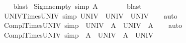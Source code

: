 \begin{isabellebody}
%
\isadelimproof
\ \ %
\endisadelimproof
%
\isatagproof
{}\isamarkupfalse%
\ blast%
\endisatagproof
{\isafoldproof}%
%
\isadelimproof
\isanewline
%
\endisadelimproof
\isanewline
{}\isamarkupfalse%
\ Sigma{\isacharunderscore}{\kern0pt}empty{}\ {\isacharbrackleft}{\kern0pt}simp{\isacharbrackright}{\kern0pt}{\isacharcolon}{\kern0pt}\ {\isachardoublequoteopen}A\ {\isasymtimes}\ {\isacharbraceleft}{\kern0pt}{\isacharbraceright}{\kern0pt}\ {\isacharequal}{\kern0pt}\ {\isacharbraceleft}{\kern0pt}{\isacharbraceright}{\kern0pt}{\isachardoublequoteclose}\isanewline
%
\isadelimproof
\ \ %
\endisadelimproof
%
\isatagproof
{}\isamarkupfalse%
\ blast%
\endisatagproof
{\isafoldproof}%
%
\isadelimproof
\isanewline
%
\endisadelimproof
\isanewline
{}\isamarkupfalse%
\ UNIV{\isacharunderscore}{\kern0pt}Times{\isacharunderscore}{\kern0pt}UNIV\ {\isacharbrackleft}{\kern0pt}simp{\isacharbrackright}{\kern0pt}{\isacharcolon}{\kern0pt}\ {\isachardoublequoteopen}UNIV\ {\isasymtimes}\ UNIV\ {\isacharequal}{\kern0pt}\ UNIV{\isachardoublequoteclose}\isanewline
%
\isadelimproof
\ \ %
\endisadelimproof
%
\isatagproof
{}\isamarkupfalse%
\ auto%
\endisatagproof
{\isafoldproof}%
%
\isadelimproof
\isanewline
%
\endisadelimproof
\isanewline
{}\isamarkupfalse%
\ Compl{\isacharunderscore}{\kern0pt}Times{\isacharunderscore}{\kern0pt}UNIV{}\ {\isacharbrackleft}{\kern0pt}simp{\isacharbrackright}{\kern0pt}{\isacharcolon}{\kern0pt}\ {\isachardoublequoteopen}{\isacharminus}{\kern0pt}\ {\isacharparenleft}{\kern0pt}UNIV\ {\isasymtimes}\ A{\isacharparenright}{\kern0pt}\ {\isacharequal}{\kern0pt}\ UNIV\ {\isasymtimes}\ {\isacharparenleft}{\kern0pt}{\isacharminus}{\kern0pt}A{\isacharparenright}{\kern0pt}{\isachardoublequoteclose}\isanewline
%
\isadelimproof
\ \ %
\endisadelimproof
%
\isatagproof
{}\isamarkupfalse%
\ auto%
\endisatagproof
{\isafoldproof}%
%
\isadelimproof
\isanewline
%
\endisadelimproof
\isanewline
{}\isamarkupfalse%
\ Compl{\isacharunderscore}{\kern0pt}Times{\isacharunderscore}{\kern0pt}UNIV{}\ {\isacharbrackleft}{\kern0pt}simp{\isacharbrackright}{\kern0pt}{\isacharcolon}{\kern0pt}\ {\isachardoublequoteopen}{\isacharminus}{\kern0pt}\ {\isacharparenleft}{\kern0pt}A\ {\isasymtimes}\ UNIV{\isacharparenright}{\kern0pt}\ {\isacharequal}{\kern0pt}\ {\isacharparenleft}{\kern0pt}{\isacharminus}{\kern0pt}A{\isacharparenright}{\kern0pt}\ {\isasymtimes}\ UNIV{\isachardoublequoteclose}\isanewline
%
\isadelimproof
\ \ %
\endisadelimproof
%
\isatagproof

\end{isabellebody}
